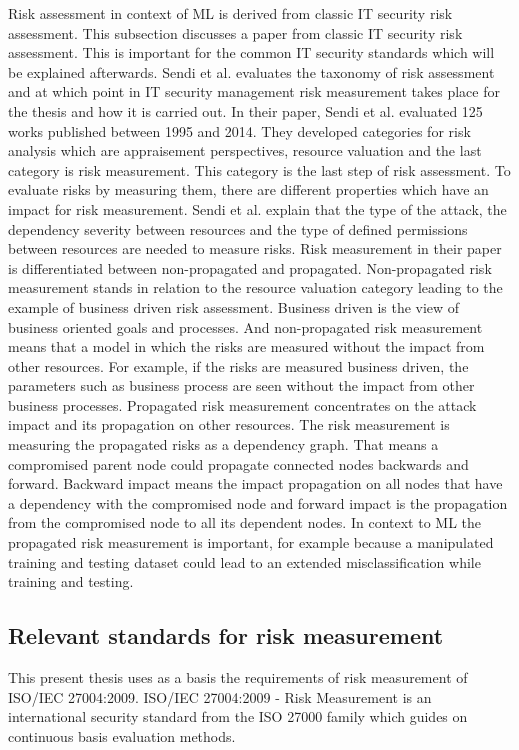 Risk assessment in context of ML is derived from classic IT security risk assessment. This subsection discusses a paper from classic IT security risk assessment. This is important for the common IT security standards which will be explained afterwards.
Sendi et al. \cite{DBLP:journals/compsec/SendiAC16} evaluates the taxonomy of risk assessment and at which point in IT security management risk measurement takes place for the thesis and
how it is carried out. In their paper, Sendi et al. evaluated 125 works published between 1995 and 2014. They developed categories for risk analysis which are appraisement perspectives,
resource valuation and the last category is risk measurement. This category is the last step of risk assessment. To evaluate risks by measuring them, there are different properties which
have an impact for risk measurement. Sendi et al. explain that the type of the attack, the dependency severity between resources and the type of defined permissions between resources are
needed to measure risks. Risk measurement in their paper is differentiated between non-propagated and propagated. Non-propagated risk measurement stands in relation to the resource
valuation category leading to the example of business driven risk assessment. Business driven is the view of business oriented goals and processes. And non-propagated risk measurement
means that a model in which the risks are measured without the impact from other resources. For example, if the risks are measured business driven, the parameters such as business process
are seen without the impact from other business processes. Propagated risk measurement concentrates on the attack impact and its propagation on other resources. The risk measurement is
measuring the propagated risks as a dependency graph. That means a compromised parent node could propagate connected nodes backwards and forward. Backward impact means the impact
propagation on all nodes that have a dependency with the compromised node and forward impact is the propagation from the compromised node to all its dependent nodes. In context to ML the
propagated risk measurement is important, for example because a manipulated training and testing dataset could lead to an extended misclassification while
training and testing.

\subsection{Relevant standards for risk measurement}

This present thesis uses as a basis the requirements of risk measurement of ISO/IEC 27004:2009. ISO/IEC 27004:2009 - Risk Measurement is an international security standard from the ISO 27000 family which guides on continuous basis evaluation methods.

